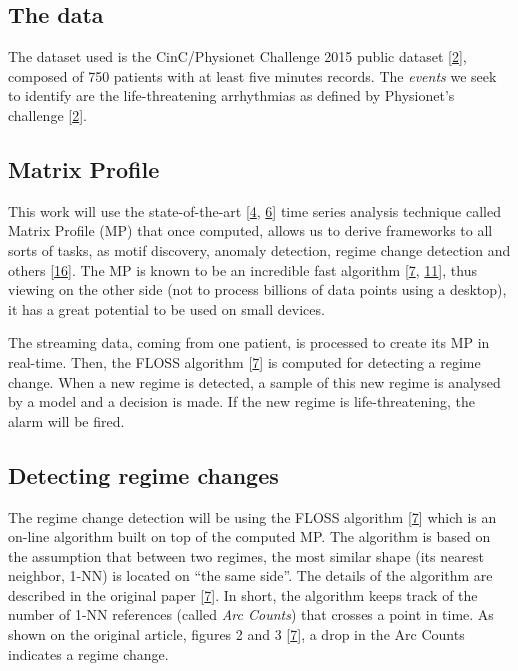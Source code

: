 \documentclass[runningheads]{llncs}
\begin{document}
\hypertarget{the-data}{%
\subsection{The data}\label{the-data}}

The dataset used is the CinC/Physionet Challenge 2015 public dataset {[}\protect\hyperlink{ref-Clifford2015}{2}{]}, composed of
750 patients with at least five minutes records. The \emph{events} we seek to identify are the
life-threatening arrhythmias as defined by Physionet's challenge {[}\protect\hyperlink{ref-Clifford2015}{2}{]}.

\hypertarget{matrix-profile}{%
\subsection{Matrix Profile}\label{matrix-profile}}

This work will use the state-of-the-art {[}\protect\hyperlink{ref-DePaepe2020}{4}, \protect\hyperlink{ref-Feremans2020}{6}{]} time series analysis technique
called Matrix Profile (MP) that once computed, allows us to derive frameworks to all sorts of tasks,
as motif discovery, anomaly detection, regime change detection and others {[}\protect\hyperlink{ref-Yeh2017a}{16}{]}. The MP is
known to be an incredible fast algorithm {[}\protect\hyperlink{ref-gharghabi2018}{7}, \protect\hyperlink{ref-Madrid2019}{11}{]}, thus viewing on the other
side (not to process billions of data points using a desktop), it has a great potential to be used
on small devices.

The streaming data, coming from one patient, is processed to create its MP in real-time. Then, the
FLOSS algorithm {[}\protect\hyperlink{ref-gharghabi2018}{7}{]} is computed for detecting a regime change. When a new regime is
detected, a sample of this new regime is analysed by a model and a decision is made. If the new
regime is life-threatening, the alarm will be fired.

\hypertarget{detecting-regime-changes}{%
\subsection{Detecting regime changes}\label{detecting-regime-changes}}

The regime change detection will be using the FLOSS algorithm {[}\protect\hyperlink{ref-gharghabi2018}{7}{]} which is an on-line
algorithm built on top of the computed MP. The algorithm is based on the assumption that between
two regimes, the most similar shape (its nearest neighbor, 1-NN) is located on ``the same side''. The
details of the algorithm are described in the original paper {[}\protect\hyperlink{ref-gharghabi2018}{7}{]}. In short, the
algorithm keeps track of the number of 1-NN references (called \emph{Arc Counts}) that crosses a point in
time. As shown on the original article, figures 2 and 3 {[}\protect\hyperlink{ref-gharghabi2018}{7}{]}, a drop in the Arc Counts
indicates a regime change.
\end{document}
